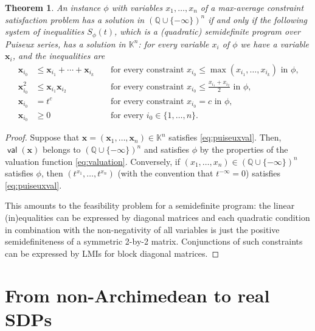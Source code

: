 \documentclass[11pt]{article}
\newtheorem{theorem}{Theorem}[section]
\theoremstyle{definition}
\theoremstyle{remark}
\newcommand{\Q}{\mathbb{Q}}
\newcommand{\puiseux}{\mathbb{K}}
\DeclareMathOperator*{\val}{\mathsf{val}}
\begin{document}
\begin{theorem}\label{nonarchSDP}
An instance $\phi$ with variables $x_1,\dots,x_n$ of a max-average constraint satisfaction problem has a solution in $(\Q \cup\{-\infty\})^n$
if and only if the following system of inequalities $S_\phi(t)$, which is a (quadratic) semidefinite program over Puiseux series, has a solution in $\puiseux^n$: 
for every variable $x_i$ of $\phi$ we have a variable $\bm{x}_i$, and the inequalities are 
\begin{equation}\label{eq:puiseuxval}
\begin{aligned}
\bm{x}_{i_0} &\le \bm{x}_{i_1} + \cdots + \bm{x}_{i_k} && \text{ for every constraint $x_{i_0} \leq \max(x_{i_1},\dots,x_{i_k})$ in $\phi$,} \\
\bm{x}^2_{i_0} &\le \bm{x}_{i_1}\bm{x}_{i_2} && \text{ for every constraint $x_{i_0} \le \frac{x_{i_1} + x_{i_2}}{2}$  in $\phi$,} \\
\bm{x}_{i_0} & = t^c && \text{ for every constraint $x_{i_0} = c$  in $\phi$,} \\
\bm{x}_{i_0} & \geq 0 && \text{ for every $i_0 \in \{1,\dots,n\}$.}
\end{aligned}
\end{equation}
\end{theorem}


\begin{proof}
Suppose that $\bm{x} = (\bm{x}_1,\dots,\bm{x}_n) \in \puiseux^n$ satisfies \cref{eq:puiseuxval}. Then, $\val(\bm{x})$ belongs to $(\Q \cup \{-\infty\})^n$ and satisfies  $\phi$
by the properties of the valuation function \cref{eq:valuation}. 
Conversely, if $(x_1,\dots,x_n) \in (\Q \cup \{-\infty\})^n$ satisfies $\phi$, then $(t^{x_1},\dots,t^{x_n})$ (with the convention that $t^{-\infty} = 0$) satisfies \cref{eq:puiseuxval}. 

This amounts to the feasibility problem for a semidefinite program: 
the linear (in)equalities can be expressed by diagonal matrices and each  quadratic condition in combination with the non-negativity of all variables is just the positive semidefiniteness of a symmetric 2-by-2 matrix. 
Conjunctions of such constraints can be expressed by LMIs for block diagonal matrices. 
\end{proof}

\section{From non-Archimedean to real SDPs}
\end{document}
